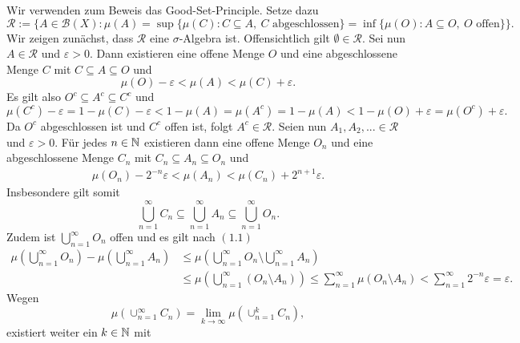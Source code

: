 \begin{proof*}
    Wir verwenden zum Beweis das Good-Set-Principle. Setze dazu
    $$
        \mathcal{R}:=\big\{A \in \mathcal{B}(X):  \mu(A) = \sup\{\mu(C): C \subseteq A, \ C \text{ abgeschlossen}\} =\inf\{\mu(O): A \subseteq O, \ O \text{ offen}\} \big\}.
    $$
    Wir zeigen zunächst, dass $\mathcal{R}$ eine $\sigma$-Algebra ist. Offensichtlich gilt $\emptyset \in \mathcal{R}$. Sei nun $A \in \mathcal{R}$ und $\varepsilon > 0$. 
    Dann existieren eine offene Menge $O$ und eine abgeschlossene Menge $C$ mit $C \subseteq A \subseteq O$ und 
    $$
        \mu(O) - \varepsilon < \mu(A) < \mu(C) + \varepsilon.
    $$
    Es gilt also $O^c \subseteq A^c \subseteq C^c$ und 
    $$
        \mu(C^c) - \varepsilon = 1 - \mu(C) - \varepsilon < 1 - \mu(A) = \mu(A^c) = 1 - \mu(A) < 1 - \mu(O) + \varepsilon = \mu(O^c) + \varepsilon. 
    $$
    Da $O^c$ abgeschlossen ist und $C^c$ offen ist, folgt $A^c \in \mathcal{R}$. 
    \newline 
    Seien nun $A_1, A_2,... \in \mathcal{R}$ und $\varepsilon > 0$. Für jedes $n \in \mathbb{N}$ existieren dann eine offene Menge $O_n$ und eine abgeschlossene Menge $C_n$ mit $C_n \subseteq A_n \subseteq O_n$ und 
    \begin{align}
        \mu(O_n) - 2^{-n}\varepsilon < \mu(A_n) < \mu(C_n) + 2^{n+1}\varepsilon.
    \end{align}
    Insbesondere gilt somit
    $$
        \bigcup_{n = 1}^{\infty} C_n \subseteq \bigcup_{n=1}^{\infty} A_n \subseteq \bigcup_{n=1}^{\infty}O_n.
    $$
    Zudem ist $\bigcup_{n=1}^{\infty}O_n$ offen und es gilt nach $(1.1)$
    \begin{align}
        \mu\left(\bigcup_{n =1}^{\infty}O_n\right) - \mu\left(\bigcup_{n=1}^{\infty}A_n\right) &\leq \mu\left(\bigcup_{n=1}^{\infty}O_n\setminus \bigcup_{n =1}^{\infty} A_n\right) \nonumber \\\
                                                                                &\leq \mu\left(\bigcup_{n=1}^{\infty}(O_n\setminus A_n)\right) 
                                                                                \leq \sum_{n=1}^{\infty}\mu(O_n\setminus A_n)
                                                                                < \sum_{n=1}^{\infty}2^{-n}\varepsilon = \varepsilon. 
    \end{align}
    Wegen 
    $$
    \mu(\cup_{n = 1}^{\infty}C_n) = \lim_{k \to \infty}\mu(\cup_{n=1}^kC_n),
    $$
    existiert weiter ein $k \in \mathbb{N}$ mit 
    \begin{align}

\end{align}
\end{proof*}

